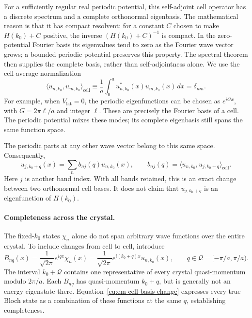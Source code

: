 For a sufficiently regular real periodic potential, this
self-adjoint cell operator has a discrete spectrum and a complete
orthonormal eigenbasis. The mathematical reason is that it has
compact resolvent: for a constant $C$ chosen to make $H(k_0)+C$
positive, the inverse $(H(k_0)+C)^{-1}$ is compact. In the
zero-potential Fourier basis its eigenvalues tend to zero as
the Fourier wave vector grows; a bounded periodic potential
preserves this property. The spectral theorem then supplies
the complete basis, rather than self-adjointness alone.
We use the cell-average normalization
\begin{equation}
  \langle u_{n,k_0},u_{m,k_0}\rangle_{\mathrm{cell}}
    \equiv\frac1a\int_0^a u_{n,k_0}^*(x)u_{m,k_0}(x)\,dx
    =\delta_{nm}.
  \label{eq:em-cell-normalization}
\end{equation}
For example, when $V_{\mathrm{lat}}=0$, the periodic eigenfunctions
can be chosen as $e^{iGx}$, with $G=2\pi\ell/a$ and integer
$\ell$. These are precisely the Fourier basis of a cell.
The periodic potential mixes these modes; its complete eigenbasis
still spans the same function space.

The periodic parts at any other wave vector belong to this
same space. Consequently,
\begin{equation}
  u_{j,k_0+q}(x)=\sum_n b_{nj}(q)u_{n,k_0}(x),
  \qquad
  b_{nj}(q)=\langle u_{n,k_0},u_{j,k_0+q}\rangle_{\mathrm{cell}}.
  \label{eq:em-cell-basis-change}
\end{equation}
Here $j$ is another band index. With all bands retained, this
is an exact change between two orthonormal cell bases.
It does not claim that $u_{j,k_0+q}$ is an eigenfunction of $H(k_0)$.

\paragraph{Completeness across the crystal.}
The fixed-$k_0$ states $\chi_n$ alone do not span arbitrary
wave functions over the entire crystal. To include changes from
cell to cell, introduce
\begin{equation}
  B_{nq}(x)=\frac{1}{\sqrt{2\pi}}e^{iqx}\chi_n(x)
    =\frac{1}{\sqrt{2\pi}}e^{i(k_0+q)x}u_{n,k_0}(x),
  \qquad q\in\mathcal Q=[-\pi/a,\pi/a).
  \label{eq:em-global-basis}
\end{equation}
The interval $k_0+\mathcal Q$ contains one representative of
every crystal quasi-momentum modulo $2\pi/a$.
Each $B_{nq}$ has quasi-momentum $k_0+q$, but is generally not
an energy eigenstate there. Equation~\eqref{eq:em-cell-basis-change}
expresses every true Bloch state as a combination of these
functions at the same $q$, establishing completeness.

